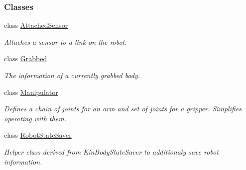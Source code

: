 \subsubsection*{Classes}
\begin{DoxyCompactItemize}
\item 
class \hyperlink{classOpenRAVE_1_1RobotBase_1_1AttachedSensor}{AttachedSensor}
\begin{DoxyCompactList}\small\item\em Attaches a sensor to a link on the robot. \item\end{DoxyCompactList}\item 
class \hyperlink{classOpenRAVE_1_1RobotBase_1_1Grabbed}{Grabbed}
\begin{DoxyCompactList}\small\item\em The information of a currently grabbed body. \item\end{DoxyCompactList}\item 
class \hyperlink{classOpenRAVE_1_1RobotBase_1_1Manipulator}{Manipulator}
\begin{DoxyCompactList}\small\item\em Defines a chain of joints for an arm and set of joints for a gripper. Simplifies operating with them. \item\end{DoxyCompactList}\item 
class \hyperlink{classOpenRAVE_1_1RobotBase_1_1RobotStateSaver}{RobotStateSaver}
\begin{DoxyCompactList}\small\item\em Helper class derived from KinBodyStateSaver to additionaly save robot information. \item\end{DoxyCompactList}\end{DoxyCompactItemize}
